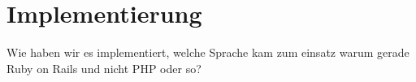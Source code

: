 \part{Implementierung}
Wie haben wir es implementiert, welche Sprache kam zum einsatz warum gerade Ruby on Rails und nicht PHP oder so?